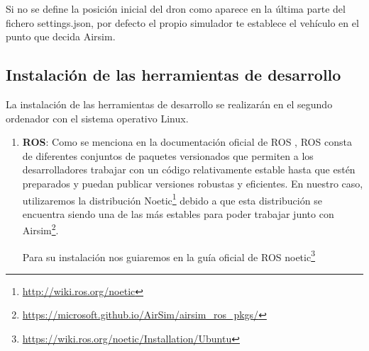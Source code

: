 Si no se define la posición inicial del dron como aparece en la última parte del fichero settings.json, por defecto el propio simulador te establece el vehículo en el punto que decida Airsim. 



  \subsection{Instalación de las herramientas de desarrollo}
  \label{subsec:Instalación de las herramientas de desarrollo}
  La instalación de las herramientas de desarrollo se realizarán en el segundo ordenador con el sistema operativo Linux.
  \begin{enumerate}
    \item \textbf{ROS}: Como se menciona en la documentación oficial de ROS \cite{Dis_ROS}, ROS consta de diferentes conjuntos de paquetes versionados que permiten a los desarrolladores
    trabajar con un código relativamente estable hasta que estén preparados y puedan publicar versiones robustas y eficientes. En nuestro caso, utilizaremos la distribución Noetic\footnote{\url{http://wiki.ros.org/noetic}}
    debido a que esta distribución se encuentra siendo una de las más estables para poder trabajar junto con Airsim\footnote{\url{https://microsoft.github.io/AirSim/airsim_ros_pkgs/}}.

    Para su instalación nos guiaremos en la guía oficial de ROS noetic\footnote{\url{https://wiki.ros.org/noetic/Installation/Ubuntu}}


\end{enumerate}

